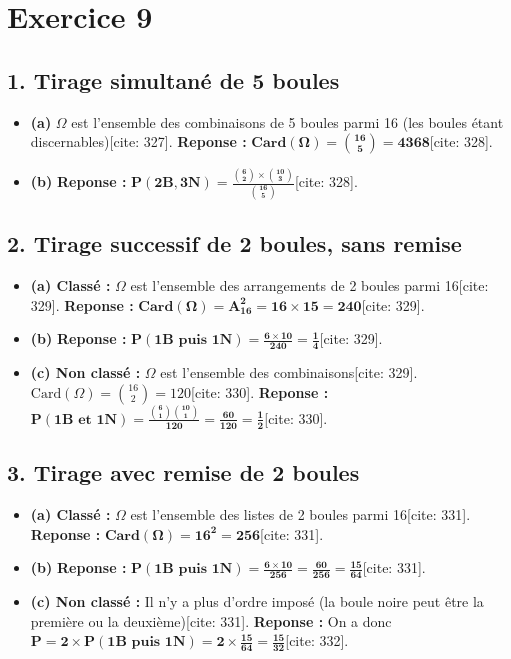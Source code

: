 \documentclass[11pt,a4paper]{article}
\begin{document}
\hrulefill

\section*{Exercice 9}

\subsection*{1. Tirage simultané de 5 boules}

\begin{itemize}
    \item \textbf{(a)} $\Omega$ est l'ensemble des combinaisons de 5 boules parmi 16 (les boules étant discernables)[cite: 327]. 
    \textbf{Reponse :} $\mathbf{\text{Card}(\Omega) = \binom{16}{5} = 4368}$[cite: 328].
    \item \textbf{(b)} \textbf{Reponse :} $\mathbf{P(2B, 3N) = \frac{\binom{6}{2} \times \binom{10}{3}}{\binom{16}{5}}}$[cite: 328].
\end{itemize}

\subsection*{2. Tirage successif de 2 boules, sans remise}

\begin{itemize}
    \item \textbf{(a) Classé :} $\Omega$ est l'ensemble des arrangements de 2 boules parmi 16[cite: 329]. 
    \textbf{Reponse :} $\mathbf{\text{Card}(\Omega) = A_{16}^2 = 16 \times 15 = 240}$[cite: 329].
    \item \textbf{(b)} \textbf{Reponse :} $\mathbf{P(\text{1B puis 1N}) = \frac{6 \times 10}{240} = \frac{1}{4}}$[cite: 329].
    \item \textbf{(c) Non classé :} $\Omega$ est l'ensemble des combinaisons[cite: 329]. $\text{Card}(\Omega) = \binom{16}{2} = 120$[cite: 330]. 
    \textbf{Reponse :} $\mathbf{P(\text{1B et 1N}) = \frac{\binom{6}{1} \binom{10}{1}}{120} = \frac{60}{120} = \frac{1}{2}}$[cite: 330].
\end{itemize}

\subsection*{3. Tirage avec remise de 2 boules}

\begin{itemize}
    \item \textbf{(a) Classé :} $\Omega$ est l'ensemble des listes de 2 boules parmi 16[cite: 331]. 
    \textbf{Reponse :} $\mathbf{\text{Card}(\Omega) = 16^2 = 256}$[cite: 331].
    \item \textbf{(b)} \textbf{Reponse :} $\mathbf{P(\text{1B puis 1N}) = \frac{6 \times 10}{256} = \frac{60}{256} = \frac{15}{64}}$[cite: 331].
    \item \textbf{(c) Non classé :} Il n'y a plus d'ordre imposé (la boule noire peut être la première ou la deuxième)[cite: 331]. 
    \textbf{Reponse :} On a donc $\mathbf{P = 2 \times P(\text{1B puis 1N}) = 2 \times \frac{15}{64} = \frac{15}{32}}$[cite: 332].
\end{itemize}
\end{document}
